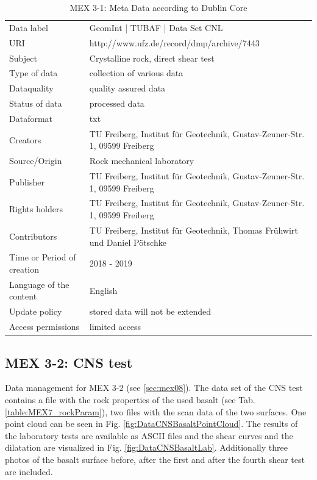 \begin{table}[h!]
\caption{MEX 3-1: Meta Data according to Dublin Core}
\label{tab:}
\small
\begin{tabular}{R{3cm}|L{7cm}}
\hline
%
Data label & GeomInt | TUBAF | Data Set CNL \\
URI & http://www.ufz.de/record/dmp/archive/7443 \\
Subject  & Crystalline rock, direct shear test \\
Type of data  & collection of various data \\
Dataquality  & quality assured data \\
Status of data  & processed data \\
Dataformat  & txt \\
Creators  & TU Freiberg, Institut für Geotechnik, Gustav-Zeuner-Str. 1, 09599 Freiberg \\
Source/Origin  & Rock mechanical laboratory \\
Publisher  & TU Freiberg, Institut für Geotechnik, Gustav-Zeuner-Str. 1, 09599 Freiberg \\
Rights holders  & TU Freiberg, Institut für Geotechnik, Gustav-Zeuner-Str. 1, 09599 Freiberg \\
Contributors  & TU Freiberg, Institut für Geotechnik, Thomas Fr\"uhwirt und Daniel P\"otschke \\
Time or Period of creation  & 2018 - 2019 \\
Language of the content & English \\
Update policy  & stored data will not be extended \\
Access permissions  & limited access \\
%
\hline
\end{tabular}
\end{table}

\subsection{MEX 3-2: CNS test}\label{DataManMex3-2CNS}

Data management for MEX 3-2 (see \ref{sec:mex08}).
The data set of the CNS test contains a file with the rock properties of the used basalt (see Tab. \ref{table:MEX7_rockParam}), two files with the scan data of the two surfaces. One point cloud can be seen in Fig. \ref{fig:DataCNSBasaltPointCloud}. The results of the laboratory tests are available as ASCII files and the shear curves and the dilatation are visualized in Fig. \ref{fig:DataCNSBasaltLab}. Additionally three photos of the basalt surface before, after the first and after the fourth shear test are included. 

